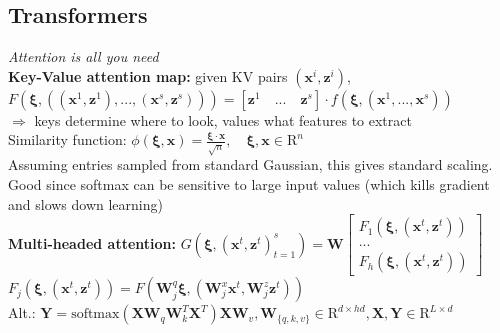 \subsection*{Transformers}
\textit{Attention is all you need}\\
\textbf{Key-Value attention map:} given KV pairs $(\mathbf x^i,\mathbf z^i)$,\\ $F(\pmb\xi,((\mathbf x^1,\mathbf z^1),...,(\mathbf x^s,\mathbf z^s)))=[\mathbf z^1\quad...\quad\mathbf z^s]\cdot f(\pmb\xi,(\mathbf x^1,...,\mathbf x^s))$\\
$\Rightarrow$ keys determine where to look, values what features to extract\\
Similarity function: $\phi(\pmb\xi,\mathbf x)=\frac{\pmb\xi\cdot\mathbf x}{\sqrt n},\quad \pmb\xi,\mathbf x\in\mathrm R^n$\\
Assuming entries sampled from standard Gaussian, this gives standard scaling. Good since softmax can be sensitive to large input values (which kills gradient and slows down learning)\\
\textbf{Multi-headed attention:} $G(\pmb\xi,(\mathbf x^t,\mathbf z^t)_{t=1}^s)=\mathbf W\begin{bmatrix}F_1(\pmb\xi,(\mathbf x^t,\mathbf z^t))\\...\\F_h(\pmb\xi,(\mathbf x^t,\mathbf z^t)) \end{bmatrix}$\\
$F_j(\pmb\xi,(\mathbf x^t,\mathbf z^t))=F(\mathbf W_j^q\pmb\xi,(\mathbf W_j^x\mathbf x^t,\mathbf W_j^z\mathbf z^t))$\\
Alt.: $\mathbf Y=\text{softmax}(\mathbf{XW}_q\mathbf W_k^T\mathbf X^T)\mathbf{XW}_v, \mathbf W_{\{q,k,v\}}\in\mathrm R^{d\times hd},\mathbf{X,Y}\in\mathrm R^{L\times d}$\\
